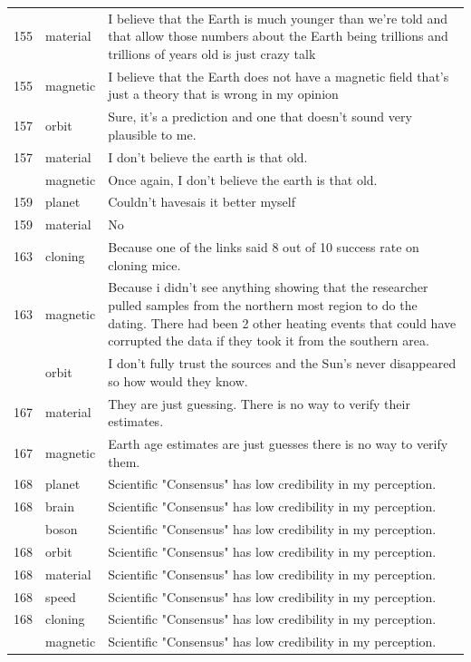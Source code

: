 \documentclass[
  doc,floatsintext]{apa6}
\begin{document}
\begin{longtable}[t]{>{}r>{}l>{\raggedright\arraybackslash}p{30em}}
155 & material & I believe that the Earth is much younger than we're told and that allow those numbers about the Earth being trillions and trillions of years old is just crazy talk\\
155 & magnetic & I believe that the Earth does not have a magnetic field that's just a theory that is wrong in my opinion\\
157 & orbit & Sure, it's a prediction and one that doesn't sound very plausible to me.\\
157 & material & I don't believe the earth is that old.\\
\addlinespace
157 & magnetic & Once again, I don't believe the earth is that old.\\
159 & planet & Couldn't havesais it better myself\\
159 & material & No\\
163 & cloning & Because one of the links said 8 out of 10 success rate on cloning mice.\\
163 & magnetic & Because i didn't see anything showing that the researcher pulled samples from the northern most region to do the dating. There had been 2 other heating events that could have corrupted the data if they took it from the southern area.\\
\addlinespace
164 & orbit & I don't fully trust the sources and the Sun's never disappeared so how would they know.\\
167 & material & They are just guessing. There is no way to verify their estimates.\\
167 & magnetic & Earth age estimates are just guesses there is no way to verify them.\\
168 & planet & Scientific "Consensus" has low credibility in my perception.\\
168 & brain & Scientific "Consensus" has low credibility in my perception.\\
\addlinespace
168 & boson & Scientific "Consensus" has low credibility in my perception.\\
168 & orbit & Scientific "Consensus" has low credibility in my perception.\\
168 & material & Scientific "Consensus" has low credibility in my perception.\\
168 & speed & Scientific "Consensus" has low credibility in my perception.\\
168 & cloning & Scientific "Consensus" has low credibility in my perception.\\
\addlinespace
168 & magnetic & Scientific "Consensus" has low credibility in my perception.\\

\end{longtable}
\end{document}
